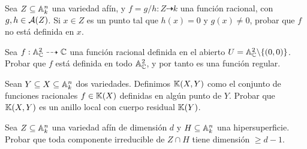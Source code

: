 \documentclass[ACGA.tex]{subfiles}
\begin{document}
\begin{ejer}
 Sea $Z\subseteq\mathbb{A}^n_k$ una variedad afín, y $f=g/h:Z\dashrightarrow k$ una función racional, con $g,h\in\mathcal{A}(Z)$. Si $x\in Z$ es un punto tal que $h(x)=0$ y $g(x)\neq 0$, probar que $f$ no está definida en $x$.
\end{ejer}

\begin{ejer}\label{a2menos0}
 Sea $f:\mathbb{A}^2_{\mathbb{C}}\dashrightarrow\mathbb{C}$ una función racional definida en el abierto $U=\mathbb{A}^2_{\mathbb{C}}\backslash\{(0,0)\}$. Probar que $f$ está definida en todo $\mathbb{A}^2_{\mathbb{C}}$, y por tanto es una función regular.
\end{ejer}

\begin{ejer}
 Sean $Y\subseteq X\subseteq\mathbb{A}^n_k$ dos variedades. Definimos $\mathbb{K}(X,Y)$ como el conjunto de funciones racionales $f\in\mathbb{K}(X)$ definidas en algún punto de $Y$. Probar que $\mathbb{K}(X,Y)$ es un anillo local con cuerpo residual $\mathbb{K}(Y)$.
\end{ejer}

\begin{ejer}\label{dimensionhipersuperficie}
 Sea $Z\subseteq\mathbb{A}^n_k$ una variedad afín de dimensión $d$ y $H\subseteq\mathbb{A}^n_k$ una hipersuperficie. Probar que toda componente irreducible de $Z\cap H$ tiene dimensión $\geq d-1$.
\end{ejer}
\end{document}
